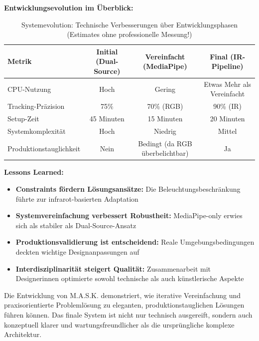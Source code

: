 \textbf{Entwicklungsevolution im Überblick:}
\begin{table}[H]
    \centering
    \begin{tabular}{|l|c|c|c|}
        \hline
        \textbf{Metrik} & \textbf{Initial (Dual-Source)} & \textbf{Vereinfacht (MediaPipe)} & \textbf{Final (IR-Pipeline)} \\ \hline
        CPU-Nutzung & Hoch & Gering & Etwas Mehr als Vereinfacht\\ \hline
        Tracking-Präzision & 75\% & 70\% (RGB) & 90\% (IR) \\ \hline
        Setup-Zeit & 45 Minuten & 15 Minuten & 20 Minuten \\ \hline
        Systemkomplexität & Hoch & Niedrig & Mittel \\ \hline
        Produktionstauglichkeit & Nein & Bedingt (da RGB überbelichtbar) & Ja \\ \hline
    \end{tabular}
    \caption{Systemevolution: Technische Verbesserungen über Entwicklungsphasen (Estimates ohne professionelle Messung!)}
    \label{tab:system_evolution}
\end{table}

\textbf{Lessons Learned:}
\begin{itemize}
    \item \textbf{Constraints fördern Lösungsansätze:} Die Beleuchtungsbeschränkung führte zur infrarot-basierten Adaptation
    \item \textbf{Systemvereinfachung verbessert Robustheit:} MediaPipe-only erwies sich als stabiler als Dual-Source-Ansatz
    \item \textbf{Produktionsvalidierung ist entscheidend:} Reale Umgebungsbedingungen deckten wichtige Designanpassungen auf
    \item \textbf{Interdisziplinarität steigert Qualität:} Zusammenarbeit mit Designerinnen optimierte sowohl technische als auch künstlerische Aspekte
\end{itemize}

Die Entwicklung von M.A.S.K. demonstriert, wie iterative Vereinfachung und praxisorientierte Problemlösung zu eleganten, produktionstauglichen Lösungen führen können. Das finale System ist nicht nur technisch ausgereift, sondern auch konzeptuell klarer und wartungsfreundlicher als die ursprüngliche komplexe Architektur.